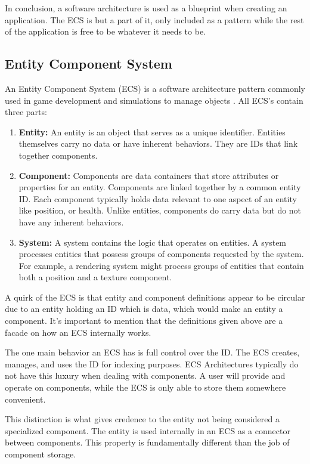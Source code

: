 In conclusion, a software architecture is used as a blueprint when creating an application. The ECS is but a part of it, only included as a pattern while the rest of the application is free to be whatever it needs to be.

\subsection{Entity Component System}
An Entity Component System (ECS) is a software architecture pattern commonly used in game development and simulations to manage objects \cite{RomeoPHD}. All ECS's contain three parts:
\begin{enumerate}
    \item \textbf{Entity:} An entity is an object that serves as a unique identifier. Entities themselves carry no data or have inherent behaviors. They are IDs that link together components.
    \item \textbf{Component:} Components are data containers that store attributes or properties for an entity. Components are linked together by a common entity ID. Each component typically holds data relevant to one aspect of an entity like position, or health. Unlike entities, components do carry data but do not have any inherent behaviors.
    \item \textbf{System:} A system contains the logic that operates on entities. A system processes entities that possess groups of components requested by the system. For example, a rendering system might process groups of entities that contain both a position and a texture component. 
\end{enumerate}

A quirk of the ECS is that entity and component definitions appear to be circular due to an entity holding an ID which is data, which would make an entity a component. It's important to mention that the definitions given above are a facade on how an ECS internally works. 

The one main behavior an ECS has is full control over the ID. The ECS creates, manages, and uses the ID for indexing purposes. ECS Architectures typically do not have this luxury when dealing with components. A user will provide and operate on components, while the ECS is only able to store them somewhere convenient. 

This distinction is what gives credence to the entity not being considered a specialized component. The entity is used internally in an ECS as a connector between components. This property is fundamentally different than the job of component storage. 

